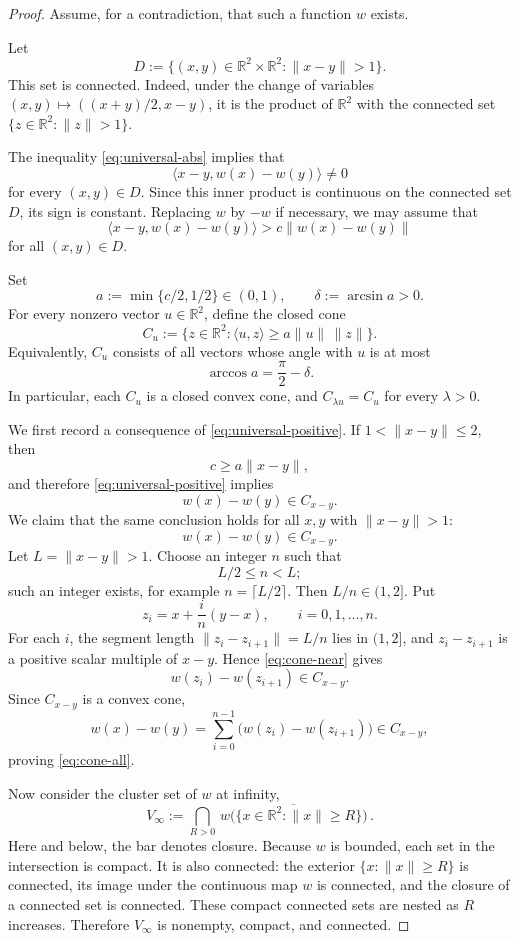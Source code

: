 \documentclass[10pt,a4paper]{amsart}
\begin{document}
\begin{proof}
Assume, for a contradiction, that such a function $w$ exists.

Let
\[
D:=\{(x,y)\in\mathbb R^2\times\mathbb R^2:\|x-y\|>1\}.
\]
This set is connected. Indeed, under the change of variables $(x,y)\mapsto ((x+y)/2,x-y)$, it is the product of $\mathbb R^2$ with the connected set $\{z\in\mathbb R^2:\|z\|>1\}$.

The inequality \eqref{eq:universal-abs} implies that
\[
\langle x-y,w(x)-w(y)\rangle\ne 0
\]
for every $(x,y)\in D$. Since this inner product is continuous on the connected set $D$, its sign is constant. Replacing $w$ by $-w$ if necessary, we may assume that
\begin{equation}\label{eq:universal-positive}
\langle x-y,w(x)-w(y)\rangle>c\|w(x)-w(y)\|
\end{equation}
for all $(x,y)\in D$.

Set
\[
a:=\min\{c/2,1/2\}\in(0,1),
\qquad
\delta:=\arcsin a>0.
\]
For every nonzero vector $u\in\mathbb R^2$, define the closed cone
\[
C_u:=\{z\in\mathbb R^2:\langle u,z\rangle\ge a\|u\|\,\|z\|\}.
\]
Equivalently, $C_u$ consists of all vectors whose angle with $u$ is at most
\[
\arccos a=\frac{\pi}{2}-\delta .
\]
In particular, each $C_u$ is a closed convex cone, and $C_{\lambda u}=C_u$ for every $\lambda>0$.

We first record a consequence of \eqref{eq:universal-positive}. If $1<\|x-y\|\le 2$, then
\[
c\ge a\|x-y\|,
\]
and therefore \eqref{eq:universal-positive} implies
\begin{equation}\label{eq:cone-near}
w(x)-w(y)\in C_{x-y}.
\end{equation}
We claim that the same conclusion holds for all $x,y$ with $\|x-y\|>1$:
\begin{equation}\label{eq:cone-all}
w(x)-w(y)\in C_{x-y}.
\end{equation}
Let $L=\|x-y\|>1$. Choose an integer $n$ such that
\[
L/2\le n<L;
\]
such an integer exists, for example $n=\lceil L/2\rceil$. Then $L/n\in(1,2]$. Put
\[
z_i=x+\frac{i}{n}(y-x), \qquad i=0,1,\ldots,n.
\]
For each $i$, the segment length $\|z_i-z_{i+1}\|=L/n$ lies in $(1,2]$, and $z_i-z_{i+1}$ is a positive scalar multiple of $x-y$. Hence \eqref{eq:cone-near} gives
\[
w(z_i)-w(z_{i+1})\in C_{x-y}.
\]
Since $C_{x-y}$ is a convex cone,
\[
w(x)-w(y)=\sum_{i=0}^{n-1}\bigl(w(z_i)-w(z_{i+1})\bigr)
\in C_{x-y},
\]
proving \eqref{eq:cone-all}.

Now consider the cluster set of $w$ at infinity,
\[
V_\infty:=\bigcap_{R>0}
\overline{\,w\bigl(\{x\in\mathbb R^2:\|x\|\ge R\}\bigr)\,}.
\]
Here and below, the bar denotes closure. Because $w$ is bounded, each set in the intersection is compact. It is also connected: the exterior $\{x:\|x\|\ge R\}$ is connected, its image under the continuous map $w$ is connected, and the closure of a connected set is connected. These compact connected sets are nested as $R$ increases. Therefore $V_\infty$ is nonempty, compact, and connected.


\end{proof}
\end{document}
